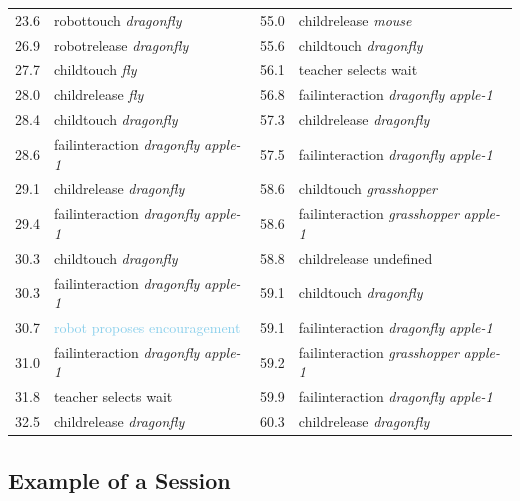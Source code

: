{\begin{table}[ht]
\begin{tabularx}{\textwidth}{@{}L{.2}L{1.7}|L{.2}L{1.9}@{}}
23.6 & robottouch \emph{dragonfly} & 55.0 & childrelease \emph{mouse}\\
26.9 & robotrelease \emph{dragonfly} & 55.6 & childtouch \emph{dragonfly}\\
27.7 & childtouch \emph{fly} & 56.1 & \textcolor{BurntOrange}{teacher selects wait}\\
28.0 & childrelease \emph{fly} & 56.8 & failinteraction \emph{dragonfly} \emph{apple-1}\\
28.4 & childtouch \emph{dragonfly} & 57.3 & childrelease \emph{dragonfly}\\
28.6 & failinteraction \emph{dragonfly} \emph{apple-1} & 57.5 & failinteraction \emph{dragonfly} \emph{apple-1}\\
29.1 & childrelease \emph{dragonfly} & 58.6 & childtouch \emph{grasshopper}\\
29.4 & failinteraction \emph{dragonfly} \emph{apple-1} & 58.6 & failinteraction \emph{grasshopper} \emph{apple-1}\\
30.3 & childtouch \emph{dragonfly} & 58.8 & childrelease undefined\\
30.3 & failinteraction \emph{dragonfly} \emph{apple-1} & 59.1 & childtouch \emph{dragonfly}\\
30.7 & \textcolor{SkyBlue}{robot proposes encouragement} & 59.1 & failinteraction \emph{dragonfly} \emph{apple-1}\\
31.0 & failinteraction \emph{dragonfly} \emph{apple-1} & 59.2 & failinteraction \emph{grasshopper} \emph{apple-1}\\
31.8 & \textcolor{BurntOrange}{teacher selects wait} & 59.9 & failinteraction \emph{dragonfly} \emph{apple-1}\\
32.5 & childrelease \emph{dragonfly} & 60.3 & childrelease \emph{dragonfly}\\
			\bottomrule
		\end{tabularx}
	\end{table}
	\clearpage
}

\subsection{Example of a Session}

